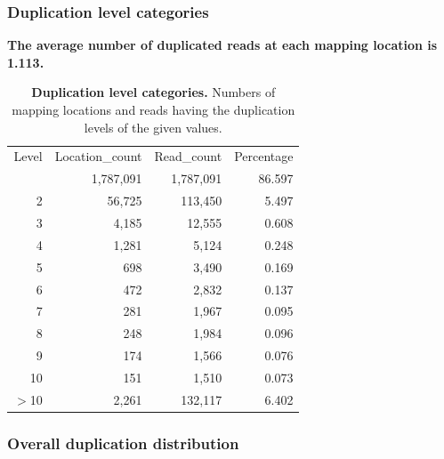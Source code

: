 \documentclass{article}
\begin{document}
\subsubsection{Duplication level categories}
\textbf{The average number of duplicated reads at each mapping location is 1.113.}
\begin{table}
\begin{tabular}{|r|r|r|r|}
  \hline
Level & Location\_count & Read\_count & Percentage \\ 
  \rowcolor[gray]{0.9} \hline
1 & 1,787,091 & 1,787,091 & 86.597 \\ 
  2 & 56,725 & 113,450 &  5.497 \\ 
   \rowcolor[gray]{0.9}3 & 4,185 & 12,555 &  0.608 \\ 
  4 & 1,281 & 5,124 &  0.248 \\ 
   \rowcolor[gray]{0.9}5 & 698 & 3,490 &  0.169 \\ 
  6 & 472 & 2,832 &  0.137 \\ 
   \rowcolor[gray]{0.9}7 & 281 & 1,967 &  0.095 \\ 
  8 & 248 & 1,984 &  0.096 \\ 
   \rowcolor[gray]{0.9}9 & 174 & 1,566 &  0.076 \\ 
  10 & 151 & 1,510 &  0.073 \\ 
   \rowcolor[gray]{0.9}$>$10 & 2,261 & 132,117 &  6.402 \\ 
   \hline
\end{tabular}\caption{\textbf{Duplication level categories.} Numbers of mapping locations and reads having the duplication levels of the given values.}
\end{table}

\subsubsection{Overall duplication distribution}
\end{document}
